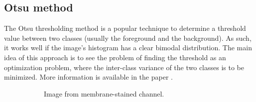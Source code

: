 \documentclass[
  digital,     %
  oneside,     %
  nosansbold,  %
  nocolorbold, %
  lof,         %
  lot,         %
]{fithesis4}
\begin{document}
\subsection{Otsu method}

The Otsu thresholding method is a popular technique to determine a threshold
value between two classes (usually the foreground and the background). As such,
it works well if the image's histogram has a clear bimodal distribution. The
main idea of this approach is to see the problem of finding the threshold as an
optimization problem, where the inter-class variance of the two classes is to be
minimized. More information is available in the paper \cite{otsu1979}.

\begin{figure}
    \begin{subfigure}[t]{0.45\textwidth}
        \centering
        \caption{Image from membrane-stained channel.}
        \label{fig:otsu-orig}
    \end{subfigure}
    \begin{subfigure}[t]{0.45\textwidth}
        \centering

\end{subfigure}
\end{figure}
\end{document}
